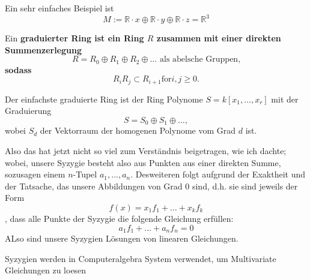 \documentclass{article}
\begin{document}
	\begin{bsp}
		Ein sehr einfaches Beispiel ist 
		\[
			M:= \mathbb{R} \cdot x \oplus
			\mathbb{R} \cdot y \oplus
			\mathbb{R} \cdot z =
			\mathbb{R}^3
		\]
	\end{bsp}
	\begin{defn}
		Ein \bf{graduierter Ring} ist ein Ring 
		\( R \)
		zusammen mit einer direkten Summenzerlegung
		\[
			R=R_{0} \oplus R_{1} \oplus R_{2} \oplus \dots 
			\text{ als abelsche Gruppen,}
		\]
		sodass 
		\[
			R_{i}R_{j} \subset R_{i+1} \text{for} i,j \ge 0.
		\]
	\end{defn}
	\begin{bsp}
		Der einfachste graduierte Ring ist der Ring Polynome
		\( S = k\left[ x_{1}, \dots ,x_{r} \right] \)
		mit der Graduierung 
		\[
			S=S_{0} \oplus S_{1} \oplus \dots ,
		\]
		wobei 
		\( S_{d} \) 
		der Vektorraum der homogenen Polynome vom Grad
		\( d \) 
		ist.
	\end{bsp}
	
	Also das hat jetzt nicht so viel zum Verst\"andnis beigetragen, 
	wie ich dachte;  
	wobei,
	unsere Syzygie besteht also aus Punkten 
	aus einer direkten Summe, 
	sozusagen einem 
	\(n\)-Tupel 
	\(a_{1},\dots,a_{n}\).
	Desweiteren folgt aufgrund der Exaktheit und der Tatsache, 
	das unsere Abbildungen von Grad 0 sind,
	d.h. sie sind jeweils der Form
	\[
		f\left( x \right)=x_{1}f_{1} + \dots + x_{k}f_{k}
	\],
	dass alle Punkte der Syzygie die folgende Gleichung erf\"ullen:
	\[
		a_{1} f_{1} + \dots + a_{n} f_{n} = 0	
	\]
	ALso sind unsere Syzygien L\"osungen von linearen Gleichungen.
	
	Syzygien werden in Computeralgebra System verwendet,
	um Multivariate Gleichungen zu loesen\nocite{WA_1}

	
\end{document}
